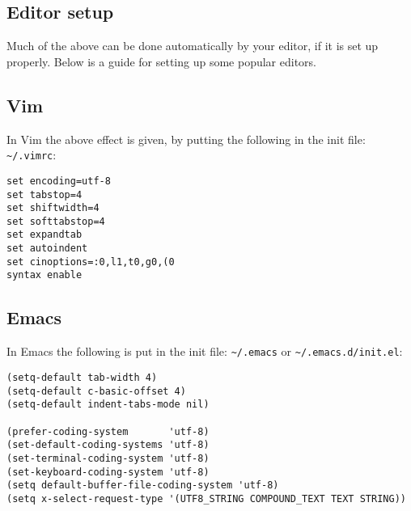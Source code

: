 \documentclass[article, 10pt]{memoir}
\begin{document}
\begin{multicols}{2}
    \section{Editor setup}
    Much of the above can be done automatically by your editor, if it is set up properly. Below is a guide for setting up some popular editors.

    \subsection{Vim}
    In Vim the above effect is given, by putting the following in the init file: \verb|~/.vimrc|:
    \begin{lstlisting}
set encoding=utf-8
set tabstop=4
set shiftwidth=4
set softtabstop=4
set expandtab
set autoindent
set cinoptions=:0,l1,t0,g0,(0
syntax enable
    \end{lstlisting}

    \subsection{Emacs}
    In Emacs the following is put in the init file: \verb|~/.emacs| or \verb|~/.emacs.d/init.el|:
    \begin{lstlisting}
(setq-default tab-width 4)
(setq-default c-basic-offset 4)
(setq-default indent-tabs-mode nil)

(prefer-coding-system       'utf-8)
(set-default-coding-systems 'utf-8)
(set-terminal-coding-system 'utf-8)
(set-keyboard-coding-system 'utf-8)
(setq default-buffer-file-coding-system 'utf-8)
(setq x-select-request-type '(UTF8_STRING COMPOUND_TEXT TEXT STRING))
    \end{lstlisting}


\end{multicols}
\end{document}
